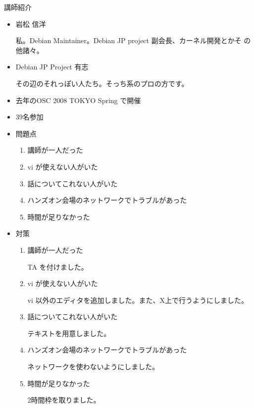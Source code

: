 \begin{frame}{講師紹介}
\begin{itemize}
\item 岩松 信洋

私。Debian Maintainer。Debian JP project 副会長、カーネル開発とかそ
 の他諸々。
\item Debian JP Project 有志

その辺のそれっぽい人たち。そっち系のプロの方です。
\end{itemize}
\end{frame}

\begin{frame}
\begin{itemize}
\item 去年のOSC 2008 TOKYO Spring で開催
\item 39名参加
\item 問題点
\begin{enumerate}
\item 講師が一人だった
\item vi が使えない人がいた
\item 話についてこれない人がいた
\item ハンズオン会場のネットワークでトラブルがあった
\item 時間が足りなかった
\end{enumerate}
\end{itemize}
\end{frame}

\begin{frame}
\begin{itemize}
\item 対策
\begin{enumerate}
\item 講師が一人だった

TA を付けました。
\item vi が使えない人がいた

vi 以外のエディタを追加しました。また、X上で行うようにしました。
\item 話についてこれない人がいた

テキストを用意しました。
\item ハンズオン会場のネットワークでトラブルがあった

ネットワークを使わないようにしました。
\item 時間が足りなかった

2時間枠を取りました。
\end{enumerate}
\end{itemize}
\end{frame}

